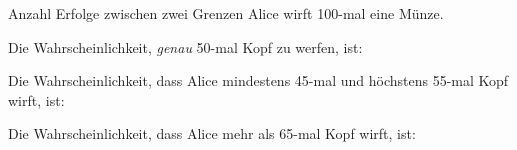 \begin{bsp}
    {Anzahl Erfolge zwischen zwei Grenzen}{}
    Alice wirft 100-mal eine Münze.

    \bigskip


    Die Wahrscheinlichkeit, \textit{genau} 50-mal Kopf zu werfen, ist:
    \vspace*{2cm}

    \bigskip

    Die Wahrscheinlichkeit, dass Alice mindestens 45-mal und höchstens 55-mal Kopf wirft, ist:

    \vspace*{5cm}


    \bigskip

    Die Wahrscheinlichkeit, dass Alice mehr als 65-mal Kopf wirft, ist:

    \vspace*{3cm}

\end{bsp}

